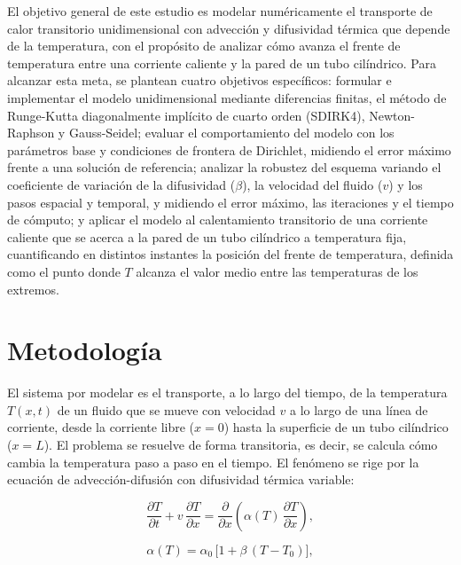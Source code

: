 \documentclass[final,5p,times,twocolumn,authoryear,11pt]{elsarticle}
\begin{document}
El objetivo general de este estudio es modelar numéricamente el transporte de calor transitorio unidimensional con advección y difusividad térmica que depende de la temperatura, con el propósito de analizar cómo avanza el frente de temperatura entre una corriente caliente y la pared de un tubo cilíndrico. Para alcanzar esta meta, se plantean cuatro objetivos específicos: formular e implementar el modelo unidimensional mediante diferencias finitas, el método de Runge-Kutta diagonalmente implícito de cuarto orden (SDIRK4), Newton-Raphson y Gauss-Seidel; evaluar el comportamiento del modelo con los parámetros base y condiciones de frontera de Dirichlet, midiendo el error máximo frente a una solución de referencia; analizar la robustez del esquema variando el coeficiente de variación de la difusividad ($\beta$), la velocidad del fluido ($v$) y los pasos espacial y temporal, y midiendo el error máximo, las iteraciones y el tiempo de cómputo; y aplicar el modelo al calentamiento transitorio de una corriente caliente que se acerca a la pared de un tubo cilíndrico a temperatura fija, cuantificando en distintos instantes la posición del frente de temperatura, definida como el punto donde $T$ alcanza el valor medio entre las temperaturas de los extremos.


\section{Metodología}
\label{sec:metodologia}


El sistema por modelar es el transporte, a lo largo del tiempo, de la temperatura $T(x,t)$ de un fluido que se mueve con velocidad $v$ a lo largo de una línea de corriente, desde la corriente libre ($x=0$) hasta la superficie de un tubo cilíndrico ($x=L$). El problema se resuelve de forma transitoria, es decir, se calcula cómo cambia la temperatura paso a paso en el tiempo. El fenómeno se rige por la ecuación de advección-difusión con difusividad térmica variable:

\begin{equation}
\frac{\partial T}{\partial t} + v\,\frac{\partial T}{\partial x} = \frac{\partial}{\partial x}\!\left(\alpha(T)\,\frac{\partial T}{\partial x}\right),
\label{eq:calor}
\end{equation}

\begin{equation}
\alpha(T)=\alpha_0\,\bigl[1+\beta\,(T-T_0)\bigr],
\label{eq:alpha}
\end{equation}
\end{document}
